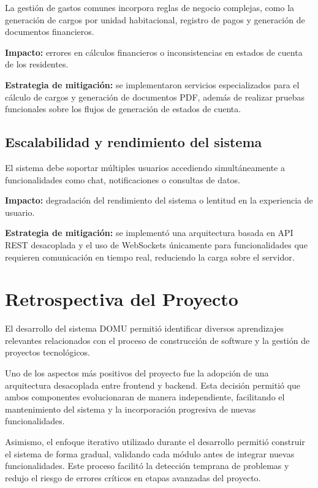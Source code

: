 La gestión de gastos comunes incorpora reglas de negocio complejas, como la generación de cargos por unidad habitacional, registro de pagos y generación de documentos financieros.

\textbf{Impacto:} errores en cálculos financieros o inconsistencias en estados de cuenta de los residentes.

\textbf{Estrategia de mitigación:} se implementaron servicios especializados para el cálculo de cargos y generación de documentos PDF, además de realizar pruebas funcionales sobre los flujos de generación de estados de cuenta.

\subsection*{Escalabilidad y rendimiento del sistema}

El sistema debe soportar múltiples usuarios accediendo simultáneamente a funcionalidades como chat, notificaciones o consultas de datos.

\textbf{Impacto:} degradación del rendimiento del sistema o lentitud en la experiencia de usuario.

\textbf{Estrategia de mitigación:} se implementó una arquitectura basada en API REST desacoplada y el uso de WebSockets únicamente para funcionalidades que requieren comunicación en tiempo real, reduciendo la carga sobre el servidor.


\section{Retrospectiva del Proyecto}

El desarrollo del sistema DOMU permitió identificar diversos aprendizajes relevantes relacionados con el proceso de construcción de software y la gestión de proyectos tecnológicos.

Uno de los aspectos más positivos del proyecto fue la adopción de una arquitectura desacoplada entre frontend y backend. 
Esta decisión permitió que ambos componentes evolucionaran de manera independiente, facilitando el mantenimiento del sistema y la incorporación progresiva de nuevas funcionalidades.

Asimismo, el enfoque iterativo utilizado durante el desarrollo permitió construir el sistema de forma gradual, validando cada módulo antes de integrar nuevas funcionalidades. 
Este proceso facilitó la detección temprana de problemas y redujo el riesgo de errores críticos en etapas avanzadas del proyecto.

